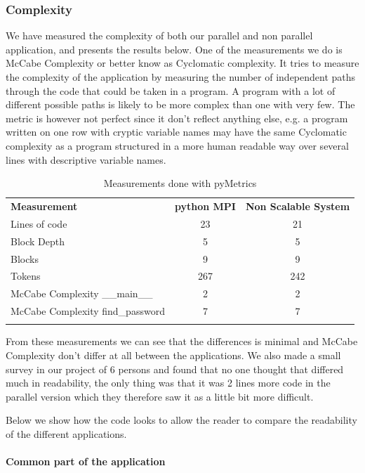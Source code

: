 \documentclass{article}
\begin{document}
\subsubsection{Complexity}
We have measured the complexity of both our parallel and non parallel
application, and presents the results below. One of the measurements
we do is McCabe Complexity\cite{mccabe1976complexity} or better know as
Cyclomatic complexity. It tries to measure the complexity of the 
application by measuring the number of independent paths through the
code that could be taken in a program. A program with a lot of different
possible paths is likely to be more complex than one with very few. The
metric is however not perfect since it don't reflect anything else, e.g.  a
program written on one row with cryptic variable names may have the same
Cyclomatic complexity as a program structured in a more human readable way
over several lines with descriptive variable names.

\begin{table}[H]
\begin{tabular}{l c c}
  \rowcolor[gray]{0.5}
  {\bf Measurement} & {\bf python MPI} & {\bf Non Scalable System} \\
  Lines of code &  23  &  21 \\
  Block Depth   &   5  &   5  \\
  Blocks        &   9  &   9  \\
  Tokens        & 267  & 242  \\
  McCabe Complexity \_\_main\_\_ & 2  & 2 \\
  McCabe Complexity find\_password & 7  & 7  \\
\rowcolor[gray]{0.5}
\end{tabular}
\caption{ Measurements done with pyMetrics\cite{pymetrics}}
\end{table}
From these measurements we can see that the differences is minimal and
McCabe Complexity\cite{mccabe1976complexity} don't differ at all between
the applications. We also made a small survey in our project of 6 persons
and found that no one thought that differed much in readability, the only
thing was that it was 2 lines more code in the parallel version which they
therefore saw it as a little bit more difficult. 
\newline

Below we show how the code looks to allow the reader to compare the readability
of the different applications. 
\paragraph{Common part of the application}
{\small}
\pagebreak
\end{document}
